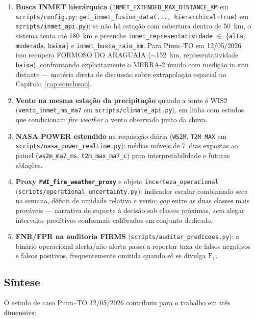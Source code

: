 \begin{enumerate}
  \item \textbf{Busca INMET hierárquica} (\texttt{INMET\_EXTENDED\_MAX\_DISTANCE\_KM} em \texttt{scripts/config.py}; \texttt{get\_inmet\_fusion\_data(..., hierarchical=True)} em \texttt{scripts/inmet\_api.py}): se não há estação com cobertura dentro de 50~km, o sistema tenta até 180~km e preenche \texttt{inmet\_representatividade} $\in$ \{\texttt{alta}, \texttt{moderada}, \texttt{baixa}\} e \texttt{inmet\_busca\_raio\_km}. Para Pium--TO em 12/05/2026 isso recupera FORMOSO DO ARAGUAIA ($\sim$152~km, representatividade \texttt{baixa}), confrontando explicitamente o MERRA-2 úmido com medição in situ distante --- matéria direta de discussão sobre extrapolação espacial no Capítulo~\ref{cap:conclusao}.
  \item \textbf{Vento na mesma estação da precipitação} quando a fonte é WIS2 (\texttt{vento\_inmet\_ms\_ma7} em \texttt{scripts/climate\_api.py}), em linha com estudos que condicionam \emph{fire weather} a vento observado junto da chuva.
  \item \textbf{NASA POWER estendido} na requisição diária (\texttt{WS2M}, \texttt{T2M\_MAX} em \texttt{scripts/nasa\_power\_realtime.py}): médias móveis de 7~dias expostas ao painel (\texttt{ws2m\_ma7\_ms}, \texttt{t2m\_max\_ma7\_c}) para interpretabilidade e futuras ablações.
  \item \textbf{Proxy \texttt{FWI\_fire\_weather\_proxy}} e objeto \texttt{incerteza\_operacional} (\texttt{scripts/operational\_uncertainty.py}): indicador escalar combinando seca na semana, déficit de umidade relativa e vento; \emph{gap} entre as duas classes mais prováveis --- narrativa de suporte à decisão sob classes próximas, \emph{sem} alegar intervalos preditivos conformais calibrados em conjunto dedicado.
  \item \textbf{FNR/FPR na auditoria FIRMS} (\texttt{scripts/auditar\_predicoes.py}): o binário operacional alerta/não alerta passa a reportar taxa de falsos negativos e falsos positivos, frequentemente omitida quando só se divulga $\text{F}_1$.
\end{enumerate}

\subsection{Síntese}
\label{subsec:pium_sintese}

O estudo de caso Pium--TO 12/05/2026 contribuiu para o trabalho em três dimensões:

